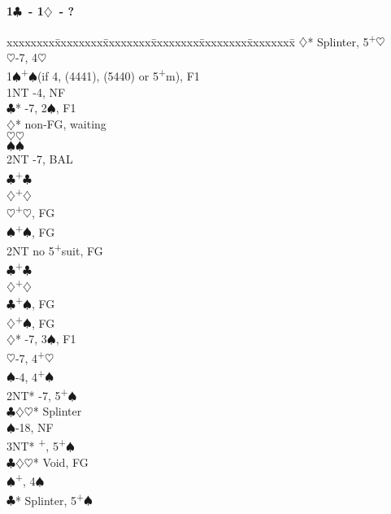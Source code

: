 \documentclass[10pt]{article}
\renewcommand{\c}{$\clubsuit$}
\renewcommand{\d}{$\diamondsuit$}
\newcommand{\h}{$\heartsuit$}
\newcommand{\s}{$\spadesuit$}
\newcommand{\p}{\textsuperscript{+}}
\newcommand{\m}{\textsuperscript{\textminus}}
\newenvironment{bidtable}[1][]
{\textbf{#1}
  \begin{adjustwidth}{1em}{}
    \addvspace{2pt}
    \begin{tabbing}
      xxxxxxxx\=xxxxxxxx\=xxxxxxxx\=xxxxxxxx\=xxxxxxxx\=xxxxxxxx\=\kill}
{\end{tabbing}\end{adjustwidth}\bigskip}%
\begin{document}
\begin{multicols*}{2}
\begin{bidtable}[1\c\ - 1\d\ - ?]
     \d* \> Splinter, 5\p\h                    \\
     \h  {}-7, 4\h                           \\
1\s  {}\p\s (if 4, (4441), (5440) or 5\p m), F1  \\
     \> 1NT  -4, NF                            \\
     \c* {}-7, 2\m\s, F1                     \\
     \>      \d*     \> non-FG, waiting        \\
     \>      \>          \h {}\h             \\
     \>      \>          \s {}\s             \\
     \>      \>          \> 2NT -7, BAL        \\
     \>      \>          \c {}\p\c           \\
     \>      \>          \d {}\p\d           \\
     \>      \h      {}\p\h, FG              \\
     \>      \s      {}\p\s, FG              \\
     \>      \> 2NT      \> no 5\p suit, FG        \\
     \>      \>          \c {}\p\c           \\
     \>      \>          \d {}\p\d           \\
     \>      \c      {}\p\s, FG              \\
     \>      \d      {}\p\s, FG              \\
     \d* {}-7, 3\s, F1                       \\
     \h  {}-7, 4\p\h                         \\
     \s  {}-4, 4\p\s                         \\
     \> 2NT* -7, 5\p\s                         \\
     \>      \c\d\h* \> Splinter               \\
     \>      \s      {}-18, NF              \\
     \>      \> 3NT*     \p, 5\p\s            \\
     \>      \c\d\h* \> Void, FG               \\
     \>      \s      {}\p, 4\s              \\
     \c* \> Splinter, 5\p\s                    \\

\end{bidtable}
\end{multicols*}
\end{document}
